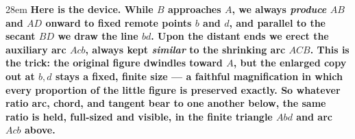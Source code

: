 \documentclass[border=4pt]{standalone}
\begin{document}
\begin{varwidth}{28em}
\large\bfseries
Here is the device. While $B$ approaches $A$, we always \emph{produce} $AB$ and $AD$ onward to      fixed remote points $b$ and $d$, and parallel to the secant $BD$ we draw the line $bd$.      Upon the distant ends we erect the auxiliary arc $Acb$, always kept \emph{similar} to      the shrinking arc $ACB$. This is the trick: the original figure dwindles toward $A$, but the      enlarged copy out at $b,d$ stays a fixed, finite size --- a faithful magnification in which every      proportion of the little figure is preserved exactly. So whatever ratio arc, chord, and tangent      bear to one another below, the same ratio is held, full-sized and visible, in the      finite triangle $Abd$ and arc $Acb$ above.
\end{varwidth}
\end{document}
